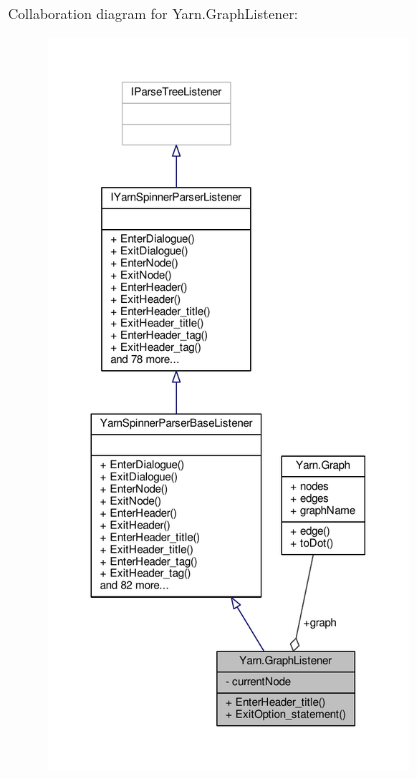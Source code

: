 Collaboration diagram for Yarn.\-Graph\-Listener\-:
\nopagebreak
\begin{figure}[H]
\begin{center}
\leavevmode
\includegraphics[height=550pt]{a00600}
\end{center}
\end{figure}
